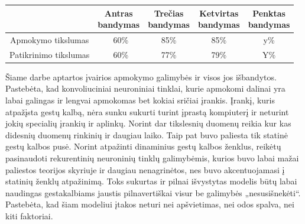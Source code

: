 \documentclass{VUMIFInfKursinis}
\begin{document}
\begin{minipage}{\linewidth}
	\centering
	 \label{tab:title} 
	\begin{tabular}{ |c|c|c|c|c| } 
		\hline
		 & \thead{Antras\\bandymas} & \thead{Trečias\\bandymas} & \thead{Ketvirtas\\bandymas} & \thead{Penktas\\bandymas} \\
		\hline
		Apmokymo tikslumas & ~60\% & 85\% & 85\% & y\% \\ 
		Patikrinimo tikslumas & ~60\% & 77\% & 79\% & Y\% \\ 
		\hline
	\end{tabular}
\end{minipage}


Šiame darbe aptartos įvairios apmokymo galimybės ir visos jos išbandytos. Pastebėta, kad konvoliuciniai neuroniniai tinklai, kurie apmokomi dalinai yra labai galingas ir lengvai apmokomas bet kokiai sričiai įrankis. Įrankį, kuris atpažįsta gestų kalbą, nėra sunku sukurti turint įprastą kompiuterį ir neturint jokių specialių įrankių ir aplinkų. Norint dar tikslesnių duomenų reikia kur kas didesnių duomenų rinkinių ir daugiau laiko. Taip pat buvo paliesta tik statinė gestų kalbos pusė. Norint atpažinti dinaminius gestų kalbos ženklus, reikėtų pasinaudoti rekurentinių neuroninių tinklų galimybėmis, kurios buvo labai mažai paliestos teorijos skyriuje ir daugiau nenagrinėtos, nes buvo akcentuojamasi į statinių ženklų atpažinimą. Toks sukurtas ir pilnai išvystytas modelis būtų labai naudingas gestakalbiams jaustis pilnavertiškai visur be galimybės „nesusišnekėti“. Pastebėta, kad šiam modeliui įtakos neturi nei apšvietimas, nei odos spalva, nei kiti faktoriai. 

\printbibliography[heading=bibintoc] %

\appendix  %
\end{document}
